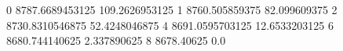 0 8787.6689453125 109.2626953125
1 8760.505859375 82.099609375
2 8730.8310546875 52.4248046875
4 8691.0595703125 12.6533203125
6 8680.744140625 2.337890625
8 8678.40625 0.0
